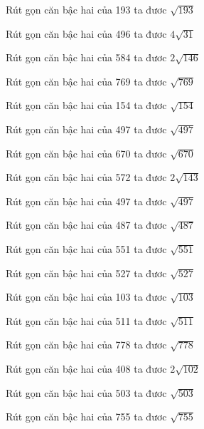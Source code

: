 \documentclass[12pt,a4paper]{article}
\begin{document}
\begin{ex}
Rút gọn căn bậc hai của 193 ta đươc $\sqrt{193}$
\end{ex}
\begin{ex}
Rút gọn căn bậc hai của 496 ta đươc $4\sqrt{31}$
\end{ex}
\begin{ex}
Rút gọn căn bậc hai của 584 ta đươc $2\sqrt{146}$
\end{ex}
\begin{ex}
Rút gọn căn bậc hai của 769 ta đươc $\sqrt{769}$
\end{ex}
\begin{ex}
Rút gọn căn bậc hai của 154 ta đươc $\sqrt{154}$
\end{ex}
\begin{ex}
Rút gọn căn bậc hai của 497 ta đươc $\sqrt{497}$
\end{ex}
\begin{ex}
Rút gọn căn bậc hai của 670 ta đươc $\sqrt{670}$
\end{ex}
\begin{ex}
Rút gọn căn bậc hai của 572 ta đươc $2\sqrt{143}$
\end{ex}
\begin{ex}
Rút gọn căn bậc hai của 497 ta đươc $\sqrt{497}$
\end{ex}
\begin{ex}
Rút gọn căn bậc hai của 487 ta đươc $\sqrt{487}$
\end{ex}
\begin{ex}
Rút gọn căn bậc hai của 551 ta đươc $\sqrt{551}$
\end{ex}
\begin{ex}
Rút gọn căn bậc hai của 527 ta đươc $\sqrt{527}$
\end{ex}
\begin{ex}
Rút gọn căn bậc hai của 103 ta đươc $\sqrt{103}$
\end{ex}
\begin{ex}
Rút gọn căn bậc hai của 511 ta đươc $\sqrt{511}$
\end{ex}
\begin{ex}
Rút gọn căn bậc hai của 778 ta đươc $\sqrt{778}$
\end{ex}
\begin{ex}
Rút gọn căn bậc hai của 408 ta đươc $2\sqrt{102}$
\end{ex}
\begin{ex}
Rút gọn căn bậc hai của 503 ta đươc $\sqrt{503}$
\end{ex}
\begin{ex}
Rút gọn căn bậc hai của 755 ta đươc $\sqrt{755}$
\end{ex}
\end{document}
